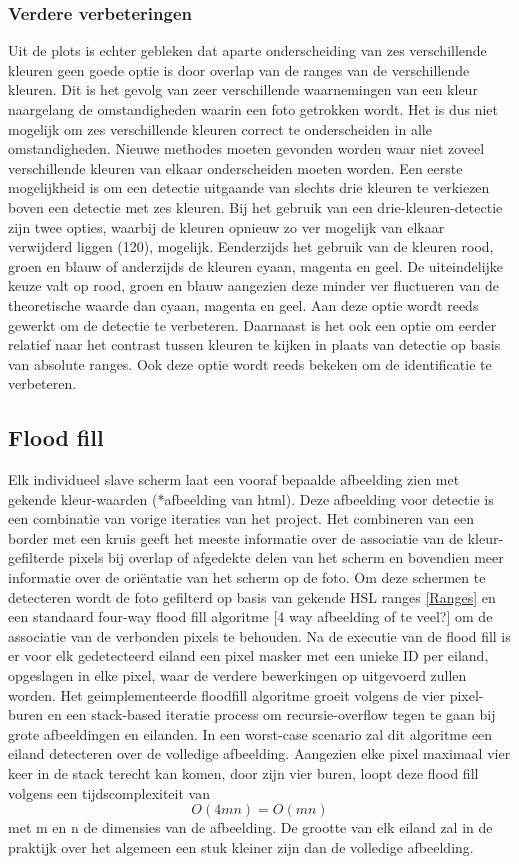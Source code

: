 \subsubsection{Verdere verbeteringen}
Uit de plots is echter gebleken dat aparte onderscheiding van zes verschillende kleuren geen goede optie is door overlap van de ranges van de verschillende kleuren. Dit is het gevolg van zeer verschillende waarnemingen van een kleur naargelang de omstandigheden waarin een foto getrokken wordt. Het is dus niet mogelijk om zes verschillende kleuren correct te onderscheiden in alle omstandigheden. Nieuwe methodes moeten gevonden worden waar niet zoveel verschillende kleuren van elkaar onderscheiden moeten worden. Een eerste mogelijkheid is om een detectie uitgaande van slechts drie kleuren te verkiezen boven een detectie met zes kleuren. Bij het gebruik van een drie-kleuren-detectie zijn twee opties, waarbij de kleuren opnieuw zo ver mogelijk van elkaar verwijderd liggen (120\degree),  mogelijk. Eenderzijds het gebruik van de kleuren rood, groen en blauw of anderzijds de kleuren cyaan, magenta en geel. De uiteindelijke keuze valt op rood, groen en blauw aangezien deze minder ver fluctueren van de theoretische waarde dan cyaan, magenta en geel. Aan deze optie wordt reeds gewerkt om de detectie te verbeteren. Daarnaast is het ook een optie om eerder relatief naar het contrast tussen kleuren te kijken in plaats van detectie op basis van absolute ranges. Ook deze optie wordt reeds bekeken om de identificatie te verbeteren.

\subsection{Flood fill}
Elk individueel slave scherm laat een vooraf bepaalde afbeelding zien met gekende kleur-waarden (*afbeelding van html). Deze afbeelding voor detectie is een combinatie van vorige iteraties van het project. Het combineren van een border met een kruis geeft het meeste informatie over de associatie van de kleur-gefilterde pixels bij overlap of afgedekte delen van het scherm en bovendien meer informatie over de oriëntatie van het scherm op de foto. Om deze schermen te detecteren wordt de foto gefilterd op basis van gekende HSL ranges \ref{Ranges} en een standaard four-way flood fill algoritme [4 way afbeelding of te veel?] \cite{floodfill} om de associatie van de verbonden pixels te behouden. Na de executie van de flood fill is er voor elk gedetecteerd eiland een pixel masker met een unieke ID per eiland, opgeslagen in elke pixel, waar de verdere bewerkingen op uitgevoerd zullen worden. Het geimplementeerde floodfill algoritme groeit volgens de vier pixel-buren en een stack-based iteratie process om recursie-overflow tegen te gaan bij grote afbeeldingen en eilanden. In een worst-case scenario zal dit algoritme een eiland detecteren over de volledige afbeelding. Aangezien elke pixel maximaal vier keer in de stack terecht kan komen, door zijn vier buren, loopt deze flood fill volgens een tijdscomplexiteit van 
\[O(4mn)=O(mn)\]
 met m en n de dimensies van de afbeelding. De grootte van elk eiland zal in de praktijk over het algemeen een stuk kleiner zijn dan de volledige afbeelding.

